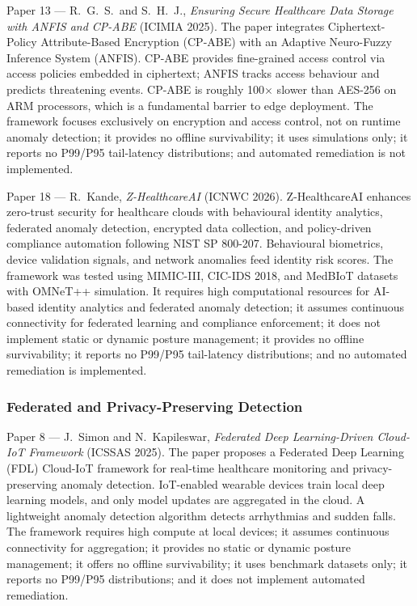 {Paper 13 --- R.~G.~S.~and S.~H.~J., \textit{Ensuring Secure Healthcare Data Storage with ANFIS and CP-ABE} (ICIMIA 2025).} The paper integrates Ciphertext-Policy Attribute-Based Encryption (CP-ABE) with an Adaptive Neuro-Fuzzy Inference System (ANFIS). CP-ABE provides fine-grained access control via access policies embedded in ciphertext; ANFIS tracks access behaviour and predicts threatening events. CP-ABE is roughly 100$\times$ slower than AES-256 on ARM processors, which is a fundamental barrier to edge deployment. The framework focuses exclusively on encryption and access control, not on runtime anomaly detection; it provides no offline survivability; it uses simulations only; it reports no P99/P95 tail-latency distributions; and automated remediation is not implemented.

{Paper 18 --- R.~Kande, \textit{Z-HealthcareAI} (ICNWC 2026).} Z-HealthcareAI enhances zero-trust security for healthcare clouds with behavioural identity analytics, federated anomaly detection, encrypted data collection, and policy-driven compliance automation following NIST SP 800-207. Behavioural biometrics, device validation signals, and network anomalies feed identity risk scores. The framework was tested using MIMIC-III, CIC-IDS 2018, and MedBIoT datasets with OMNeT++ simulation. It requires high computational resources for AI-based identity analytics and federated anomaly detection; it assumes continuous connectivity for federated learning and compliance enforcement; it does not implement static or dynamic posture management; it provides no offline survivability; it reports no P99/P95 tail-latency distributions; and no automated remediation is implemented.

\subsubsection{Federated and Privacy-Preserving Detection}

{Paper 8 --- J.~Simon and N.~Kapileswar, \textit{Federated Deep Learning-Driven Cloud-IoT Framework} (ICSSAS 2025).} The paper proposes a Federated Deep Learning (FDL) Cloud-IoT framework for real-time healthcare monitoring and privacy-preserving anomaly detection. IoT-enabled wearable devices train local deep learning models, and only model updates are aggregated in the cloud. A lightweight anomaly detection algorithm detects arrhythmias and sudden falls. The framework requires high compute at local devices; it assumes continuous connectivity for aggregation; it provides no static or dynamic posture management; it offers no offline survivability; it uses benchmark datasets only; it reports no P99/P95 distributions; and it does not implement automated remediation.

